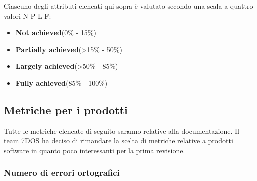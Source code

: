 Ciascuno degli attributi elencati qui sopra è valutato secondo una scala a quattro valori N-P-L-F:
\begin{itemize}
	\item{\textbf{Not achieved}}(0\% - 15\%)
	\item{\textbf{Partially achieved}}(>15\% - 50\%)
	\item{\textbf{Largely achieved}}(>50\% - 85\%)
	\item{\textbf{Fully achieved}}(85\% - 100\%)
\end{itemize}
\subsection{Metriche per i prodotti}
Tutte le metriche elencate di seguito saranno relative alla documentazione. Il team 7DOS ha deciso di rimandare la scelta di metriche relative a prodotti software in quanto poco interessanti per la prima revisione.
\subsubsection{Numero di errori ortografici}
\pagebreak